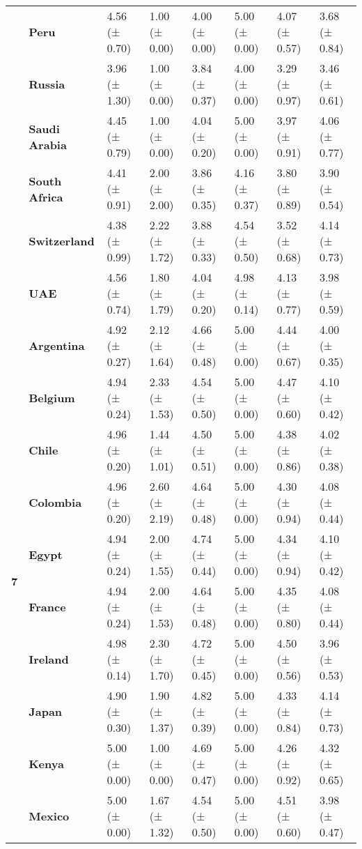 \begin{longtable}{llllllll}
\textbf{} & \textbf{Peru} & 4.56 (± 0.70) & 1.00 (± 0.00) & 4.00 (± 0.00) & 5.00 (± 0.00) & 4.07 (± 0.57) & 3.68 (± 0.84) \\
\textbf{} & \textbf{Russia} & 3.96 (± 1.30) & 1.00 (± 0.00) & 3.84 (± 0.37) & 4.00 (± 0.00) & 3.29 (± 0.97) & 3.46 (± 0.61) \\
\textbf{} & \textbf{Saudi Arabia} & 4.45 (± 0.79) & 1.00 (± 0.00) & 4.04 (± 0.20) & 5.00 (± 0.00) & 3.97 (± 0.91) & 4.06 (± 0.77) \\
\textbf{} & \textbf{South Africa} & 4.41 (± 0.91) & 2.00 (± 2.00) & 3.86 (± 0.35) & 4.16 (± 0.37) & 3.80 (± 0.89) & 3.90 (± 0.54) \\
\textbf{} & \textbf{Switzerland} & 4.38 (± 0.99) & 2.22 (± 1.72) & 3.88 (± 0.33) & 4.54 (± 0.50) & 3.52 (± 0.68) & 4.14 (± 0.73) \\
\textbf{} & \textbf{UAE} & 4.56 (± 0.74) & 1.80 (± 1.79) & 4.04 (± 0.20) & 4.98 (± 0.14) & 4.13 (± 0.77) & 3.98 (± 0.59) \\
\cline{1-8}
\multirow[t]{19}{*}{\textbf{7}} & \textbf{Argentina} & 4.92 (± 0.27) & 2.12 (± 1.64) & 4.66 (± 0.48) & 5.00 (± 0.00) & 4.44 (± 0.67) & 4.00 (± 0.35) \\
\textbf{} & \textbf{Belgium} & 4.94 (± 0.24) & 2.33 (± 1.53) & 4.54 (± 0.50) & 5.00 (± 0.00) & 4.47 (± 0.60) & 4.10 (± 0.42) \\
\textbf{} & \textbf{Chile} & 4.96 (± 0.20) & 1.44 (± 1.01) & 4.50 (± 0.51) & 5.00 (± 0.00) & 4.38 (± 0.86) & 4.02 (± 0.38) \\
\textbf{} & \textbf{Colombia} & 4.96 (± 0.20) & 2.60 (± 2.19) & 4.64 (± 0.48) & 5.00 (± 0.00) & 4.30 (± 0.94) & 4.08 (± 0.44) \\
\textbf{} & \textbf{Egypt} & 4.94 (± 0.24) & 2.00 (± 1.55) & 4.74 (± 0.44) & 5.00 (± 0.00) & 4.34 (± 0.94) & 4.10 (± 0.42) \\
\textbf{} & \textbf{France} & 4.94 (± 0.24) & 2.00 (± 1.53) & 4.64 (± 0.48) & 5.00 (± 0.00) & 4.35 (± 0.80) & 4.08 (± 0.44) \\
\textbf{} & \textbf{Ireland} & 4.98 (± 0.14) & 2.30 (± 1.70) & 4.72 (± 0.45) & 5.00 (± 0.00) & 4.50 (± 0.56) & 3.96 (± 0.53) \\
\textbf{} & \textbf{Japan} & 4.90 (± 0.30) & 1.90 (± 1.37) & 4.82 (± 0.39) & 5.00 (± 0.00) & 4.33 (± 0.84) & 4.14 (± 0.73) \\
\textbf{} & \textbf{Kenya} & 5.00 (± 0.00) & 1.00 (± 0.00) & 4.69 (± 0.47) & 5.00 (± 0.00) & 4.26 (± 0.92) & 4.32 (± 0.65) \\
\textbf{} & \textbf{Mexico} & 5.00 (± 0.00) & 1.67 (± 1.32) & 4.54 (± 0.50) & 5.00 (± 0.00) & 4.51 (± 0.60) & 3.98 (± 0.47) \\

\end{longtable}
